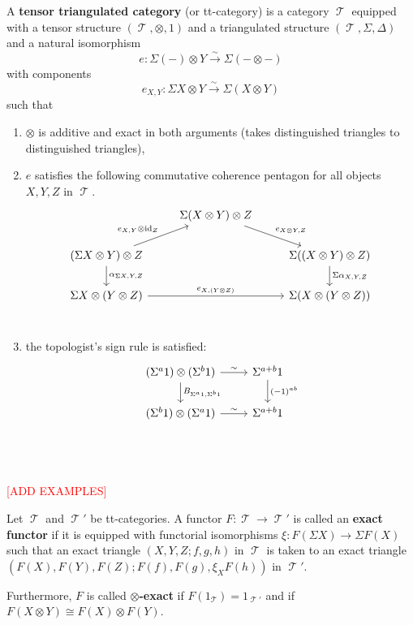 \documentclass[11pt]{article}
\DeclareMathOperator{\TT}{\mathcal{T}}
\begin{document}
\begin{defn}\label{ttcat}
	A \textbf{tensor triangulated category} (or tt-category) is a category $\TT$ equipped with a tensor structure $(\TT, \otimes, 1)$ and a triangulated structure $(\TT,\Sigma,\Delta)$ and a natural isomorphism 
	\[
		e: \Sigma(-)\otimes Y \xrightarrow{\sim} \Sigma(- \otimes -)
	\]
	with components 
	\[
		e_{X,Y}: \Sigma X \otimes Y \xrightarrow{\sim} \Sigma(X \otimes Y)
	\]
	such that
	\begin{enumerate}[1.]
		\item $\otimes$ is additive and exact in both arguments (takes distinguished triangles to distinguished triangles),
		\item $e$ satisfies the following commutative coherence pentagon for all objects $X,Y,Z$ in $\TT$.
			\[\begin{tikzcd}
			  &  \Sigma(X \otimes Y) \otimes Z \ar[from = dl, "e_{X,Y} \otimes \id_Z"] \ar[dr,"e_{X \otimes Y, Z}"] &  \\
				(\Sigma X \otimes Y) \otimes Z \ar[d, "\alpha_{\Sigma X,Y,Z}"] &   & \Sigma((X \otimes Y) \otimes Z) \ar[d,"\Sigma \alpha_{X,Y,Z}"]\\
\Sigma X \otimes (Y \otimes Z) \ar[rr,"e_{X,(Y \otimes Z)}"] &   & \Sigma(X \otimes ( Y \otimes Z))  \\
			\end{tikzcd}\]
		\item the topologist's sign rule is satisfied:
\[\begin{tikzcd}
	(\Sigma^a 1) \otimes (\Sigma^b 1) \ar[r,"\sim"] \ar[d,"B_{\Sigma^a 1,\Sigma^b 1}"] & \Sigma^{a+b}1 \ar[d,"(-1)^{ab}"]\\
	(\Sigma^b 1) \otimes (\Sigma^a 1) \ar[r,"\sim"] & \Sigma^{a+b}1  \\
\end{tikzcd}\]
	\end{enumerate}
\end{defn}

\


\large{\textcolor{red}{[ADD EXAMPLES]}} \normalsize



\begin{defn}\label{tt-exact}
Let $\TT$ and $\TT'$ be tt-categories. A functor $F: \TT \to \TT'$ is called an \textbf{exact functor} if it is equipped with functorial isomorphisms $\xi: F(\Sigma X) \to \Sigma F(X)$ such that an exact triangle $(X,Y,Z; f,g,h)$ in $\TT$ is taken to an exact triangle $(F(X),F(Y), F(Z); F(f), F(g), \xi_X F(h))$ in $\TT'$.

Furthermore, $F$ is called \textbf{$\otimes$-exact} if $F(1_{\TT}) = 1_{\TT'}$ and if $F(X \otimes Y) \cong F(X)  \otimes F(Y)$. 
\end{defn}
\end{document}
